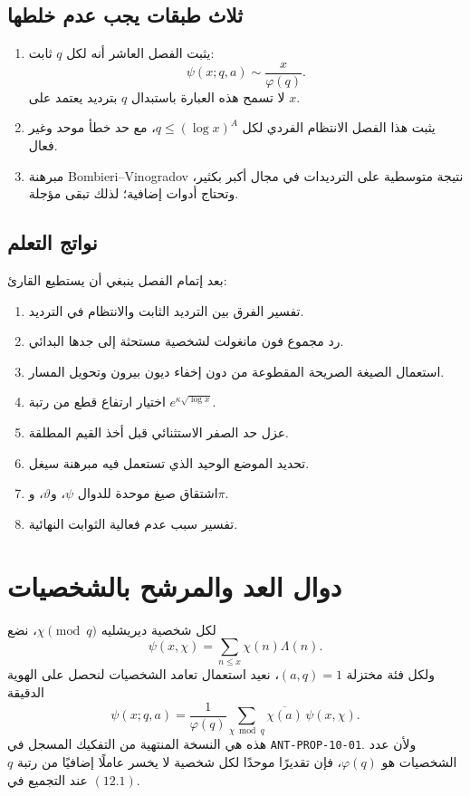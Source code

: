 \subsection{ثلاث طبقات يجب عدم خلطها}

\begin{enumerate}
  \item يثبت الفصل العاشر أنه لكل \(q\) ثابت:
  \[
  \psi(x;q,a)\sim \frac{x}{\varphi(q)}.
  \]
  لا تسمح هذه العبارة باستبدال \(q\) بترديد يعتمد على \(x\).
  \item يثبت هذا الفصل الانتظام الفردي لكل
  \(q\le(\log x)^A\)، مع حد خطأ موحد وغير فعال.
  \item مبرهنة Bombieri--Vinogradov نتيجة متوسطية على الترديدات في مجال
  أكبر بكثير، وتحتاج أدوات إضافية؛ لذلك تبقى مؤجلة.
\end{enumerate}

\subsection{نواتج التعلم}

بعد إتمام الفصل ينبغي أن يستطيع القارئ:
\begin{enumerate}
  \item تفسير الفرق بين الترديد الثابت والانتظام في الترديد.
  \item رد مجموع فون مانغولت لشخصية مستحثة إلى جدها البدائي.
  \item استعمال الصيغة الصريحة المقطوعة من دون إخفاء ديون بيرون وتحويل المسار.
  \item اختيار ارتفاع قطع من رتبة \(e^{\kappa\sqrt{\log x}}\).
  \item عزل حد الصفر الاستثنائي قبل أخذ القيم المطلقة.
  \item تحديد الموضع الوحيد الذي تستعمل فيه مبرهنة سيغل.
  \item اشتقاق صيغ موحدة للدوال \(\psi\)، و\(\vartheta\)، و\(\pi\).
  \item تفسير سبب عدم فعالية الثوابت النهائية.
\end{enumerate}

\section{دوال العد والمرشح بالشخصيات}

لكل شخصية ديريشليه \(\chi\pmod q\)، نضع
\[
\psi(x,\chi)=\sum_{n\le x}\chi(n)\Lambda(n).
\]
ولكل فئة مختزلة \((a,q)=1\)، نعيد استعمال تعامد الشخصيات لنحصل على الهوية
الدقيقة
\[
\psi(x;q,a)
=
\frac1{\varphi(q)}
\sum_{\chi\bmod q}\overline{\chi(a)}\,\psi(x,\chi).
\tag{12.1}
\]
هذه هي النسخة المنتهية من التفكيك المسجل في
\textenglish{\texttt{ANT-PROP-10-01}}. ولأن عدد الشخصيات هو \(\varphi(q)\)،
فإن تقديرًا موحدًا لكل شخصية لا يخسر عاملًا إضافيًا من رتبة \(q\) عند
التجميع في \((12.1)\).

